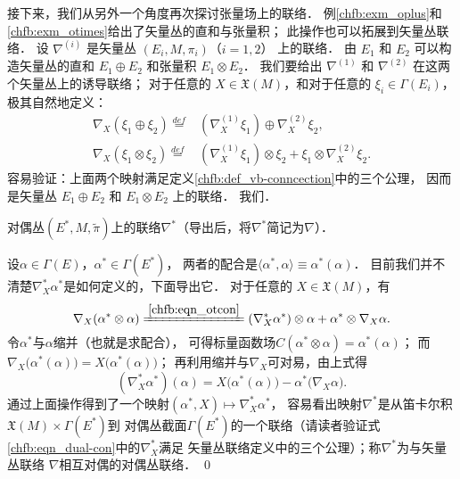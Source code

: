 接下来，我们从另外一个角度再次探讨张量场上的联络．
例\ref{chfb:exm_oplus}和\ref{chfb:exm_otimes}给出了矢量丛的直和与张量积；
此操作也可以拓展到矢量丛联络．
设 $\nabla^{(i)}$ 是矢量丛 $(E_i, M,\pi_i)$（$i=1,2$） 上的联络． 
由 $E_1$ 和 $E_2$ 可以构造矢量丛的直和 $E_1 \oplus E_2$ 和张量积 $E_1 \otimes E_2$．
我们要给出 $\nabla^{(1)}$ 和 $\nabla^{(2)}$ 在这两个矢量丛上的诱导联络；
对于任意的 $X \in \mathfrak{X}(M)$，和对于任意的 $\xi_i \in \Gamma(E_i)$，
极其自然地定义：
\begin{align}
    \nabla_X\left(\xi_1 \oplus \xi_2\right)\overset{def}{=}&
    \left(\nabla_X^{(1)} \xi_1\right) \oplus \nabla_X^{(2)} \xi_2, \label{chfb:eqn_opcon} \\
    \nabla_X\left(\xi_1 \otimes \xi_2\right)\overset{def}{=}& \left(\nabla_X^{(1)} \xi_1\right) \otimes 
    \xi_2+\xi_1 \otimes \nabla_X^{(2)} \xi_2 . \label{chfb:eqn_otcon}
\end{align}
容易验证：上面两个映射满足定义\ref{chfb:def_vb-conncection}中的三个公理，
因而是矢量丛 $E_1 \oplus E_2$ 和 $E_1 \otimes E_2$ 上的联络．
我们．


\begin{example}
    对偶丛$(E^*,M,\tilde{\pi})$上的联络$\nabla^*$（导出后，将$\nabla^*$简记为$\nabla$）．
\end{example}
设$\alpha \in \Gamma(E)$，$\alpha^*\in \Gamma(E^*)$，
两者的配合是$\langle \alpha^*, \alpha \rangle \equiv \alpha^*(\alpha)$．
目前我们并不清楚$\nabla_X^* \alpha^*$是如何定义的，下面导出它．
对于任意的 $X \in \mathfrak{X}(M)$，有
\begin{equation*}
    \nabla_X( \alpha^* \otimes \alpha )\xlongequal{\ref{chfb:eqn_otcon}}
    (\nabla_X^* \alpha^*)\otimes \alpha + \alpha^* \otimes \nabla_X \alpha .
\end{equation*}
令$\alpha^*$与$\alpha$缩并（也就是求配合），
可得标量函数场$C(\alpha^* \otimes \alpha)=\alpha^*(\alpha)$；
而$\nabla_X\bigl( \alpha^*(\alpha) \bigr)=X \bigl( \alpha^*(\alpha) \bigr)$；
再利用缩并与$\nabla_X$可对易，由上式得
\begin{equation}\label{chfb:eqn_dual-con}
    (\nabla_X^* \alpha^* )(\alpha)=X\bigl(\alpha^*(\alpha)\bigr)-\alpha^*\bigl(\nabla_X \alpha\bigr).
\end{equation}
通过上面操作得到了一个映射$(\alpha^*, X) \mapsto \nabla_X^* \alpha^*$，
容易看出映射$\nabla^*$是从笛卡尔积$\mathfrak{X}(M)\times \Gamma(E^*)$到
对偶丛截面$\Gamma (E^*)$的一个联络（请读者验证式\eqref{chfb:eqn_dual-con}中的$\nabla_X^*$满足
矢量丛联络定义中的三个公理）；称$\nabla^*$为与矢量丛联络 $\nabla$相互对偶的对偶丛联络．
\qed


